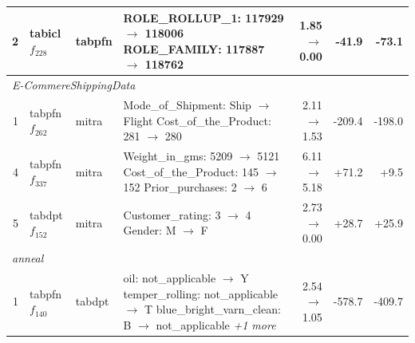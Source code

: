 \begin{table}[t]
\begin{tabularx}{\textwidth}{rllXrrr}
2 & tabicl $f_{228}$ & tabpfn & \makecell[tl]{ROLE\_ROLLUP\_1: 117929 $\to$ 118006 \\ ROLE\_FAMILY: 117887 $\to$ 118762} & 1.85 $\to$ 0.00 & -41.9 & -73.1 \\
\midrule
\multicolumn{7}{l}{\textit{E-CommereShippingData}} \\
1 & tabpfn $f_{262}$ & mitra & \makecell[tl]{Mode\_of\_Shipment: Ship $\to$ Flight \\ Cost\_of\_the\_Product: 281 $\to$ 280} & 2.11 $\to$ 1.53 & -209.4 & -198.0 \\
4 & tabpfn $f_{337}$ & mitra & \makecell[tl]{Weight\_in\_gms: 5209 $\to$ 5121 \\ Cost\_of\_the\_Product: 145 $\to$ 152 \\ Prior\_purchases: 2 $\to$ 6} & 6.11 $\to$ 5.18 & +71.2 & +9.5 \\
5 & tabdpt $f_{152}$ & mitra & \makecell[tl]{Customer\_rating: 3 $\to$ 4 \\ Gender: M $\to$ F} & 2.73 $\to$ 0.00 & +28.7 & +25.9 \\
\midrule
\multicolumn{7}{l}{\textit{anneal}} \\
1 & tabpfn $f_{140}$ & tabdpt & \makecell[tl]{oil: not\_applicable $\to$ Y \\ temper\_rolling: not\_applicable $\to$ T \\ blue\_bright\_varn\_clean: B $\to$ not\_applicable \\ \textit{+1 more}} & 2.54 $\to$ 1.05 & -578.7 & -409.7 \\
\bottomrule
\end{tabularx}
\end{table}
